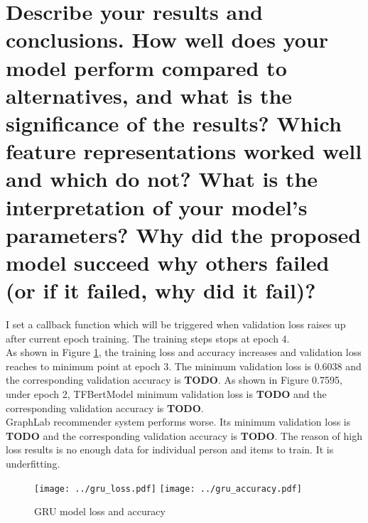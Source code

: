 \documentclass[12pt]{article}
\begin{document}
\section{Describe your results and conclusions. How well does your model perform compared to
alternatives, and what is the significance of the results? Which feature representations worked
well and which do not? What is the interpretation of your model’s parameters? Why did the
proposed model succeed why others failed (or if it failed, why did it fail)?}
I set a callback function which will be triggered when validation loss raises up after current epoch training.
The training steps stops at epoch 4.\\
As shown in Figure \ref{fig:gru}, the training loss and accuracy increases and validation loss reaches to minimum point at epoch 3. The minimum validation loss is 0.6038 and the corresponding validation accuracy is \textbf{TODO}.
As shown in Figure 0.7595, under epoch 2, TFBertModel minimum validation loss is \textbf{TODO} and the corresponding validation accuracy is \textbf{TODO}.\\
GraphLab recommender system performs worse. Its minimum validation loss is \textbf{TODO} and the corresponding validation accuracy is \textbf{TODO}. The reason of high loss results is no enough data for individual person
and items to train. It is underfitting.\\
\begin{figure}[h!]
    \centering
    \texttt{[image: ../gru\_loss.pdf]}
    \texttt{[image: ../gru\_accuracy.pdf]}
    \caption{GRU model loss and accuracy}
    \label{fig:gru}
\end{figure}
\medskip
\end{document}
